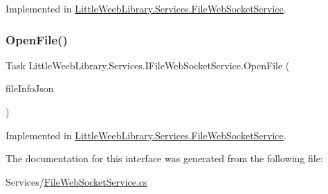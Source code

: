 Implemented in \mbox{\hyperlink{class_little_weeb_library_1_1_services_1_1_file_web_socket_service_ab1375e8e82a50dfa06d91bebe988d133}{Little\+Weeb\+Library.\+Services.\+File\+Web\+Socket\+Service}}.

\mbox{\label{interface_little_weeb_library_1_1_services_1_1_i_file_web_socket_service_a55cfbde72a70fb90c011438a1c415713}} 
\subsubsection{\texorpdfstring{Open\+File()}{OpenFile()}}
{\footnotesize\ttfamily Task Little\+Weeb\+Library.\+Services.\+I\+File\+Web\+Socket\+Service.\+Open\+File (\begin{DoxyParamCaption}\item[{J\+Object}]{file\+Info\+Json }\end{DoxyParamCaption})}



Implemented in \mbox{\hyperlink{class_little_weeb_library_1_1_services_1_1_file_web_socket_service_ae140d076e6f64585e7b71bb51545e1bb}{Little\+Weeb\+Library.\+Services.\+File\+Web\+Socket\+Service}}.



The documentation for this interface was generated from the following file\+:\begin{DoxyCompactItemize}
\item 
Services/\mbox{\hyperlink{_file_web_socket_service_8cs}{File\+Web\+Socket\+Service.\+cs}}\end{DoxyCompactItemize}
